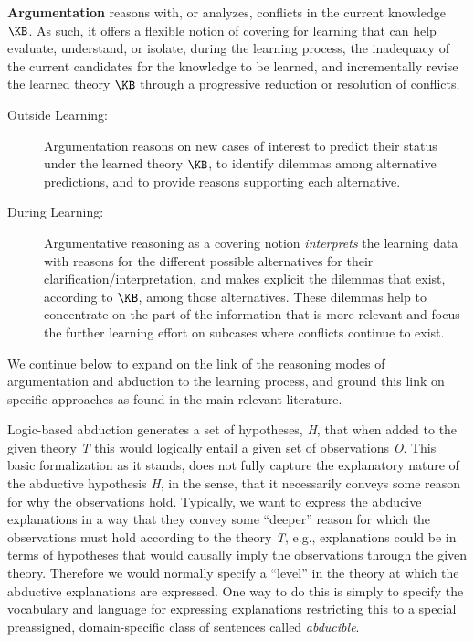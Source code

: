 \noindent \textbf{Argumentation} reasons with, or analyzes, conflicts in the current knowledge $\KB$. As such, it offers a flexible notion of covering for learning that can help evaluate, understand, or isolate, during the learning process, the inadequacy of the current candidates for the knowledge to be learned, and incrementally revise the learned theory $\KB$ through a progressive reduction or resolution of conflicts.
\begin{description}
\item[Outside Learning:] Argumentation reasons on new cases of interest to predict their status under the learned theory $\KB$, to identify dilemmas among alternative predictions, and to provide reasons supporting each alternative.
\item[During Learning:] Argumentative reasoning as a covering notion \emph{interprets} the learning data with reasons for the different possible alternatives for their clarification/interpretation, and makes explicit the dilemmas that exist, according to $\KB$, among those alternatives. These dilemmas help to concentrate on the part of the information that is more relevant and focus the further learning effort on subcases where conflicts continue to exist.
\end{description}
We continue below to expand on the link of the reasoning modes of argumentation and abduction to the learning process, and ground this link on specific approaches as found in the main relevant literature.

Logic-based abduction generates a set of hypotheses, \textit{H}, that when added to the given theory \textit{T} this would logically entail a given set of observations \textit{O}. This basic formalization as it stands, does not fully capture the explanatory nature of the abductive hypothesis \textit{H}, in the sense, that it necessarily conveys some reason for why the observations hold. Typically, we want to express the abducive explanations in a way that they convey some ``deeper'' reason for which the observations must hold according to the theory \textit{T}, e.g., explanations could be in terms of hypotheses that would causally imply the observations through the given theory. Therefore we would normally specify a ``level'' in the theory at which the abductive explanations are expressed. One way to do this is simply to specify the vocabulary and language for expressing explanations restricting this to a special preassigned, domain-specific class of sentences called \textit{abducible}.

